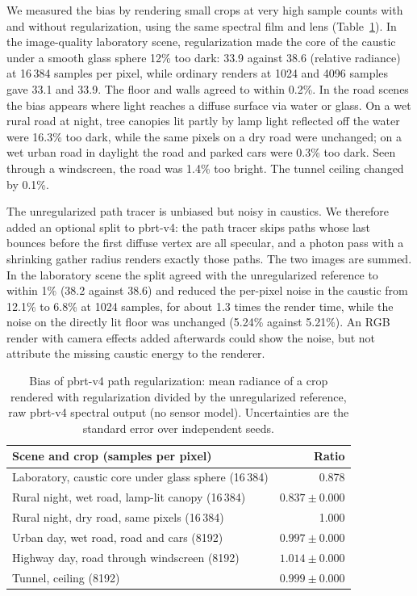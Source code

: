 \documentclass[letterpaper,twocolumn,fleqn]{article}
\begin{document}
We measured the bias by rendering small crops at very high sample counts with and without regularization, using the same spectral film and lens (Table~\ref{tab:bias}). In the image-quality laboratory scene, regularization made the core of the caustic under a smooth glass sphere 12\% too dark: 33.9 against 38.6 (relative radiance) at 16\,384 samples per pixel, while ordinary renders at 1024 and 4096 samples gave 33.1 and 33.9. The floor and walls agreed to within 0.2\%. In the road scenes the bias appears where light reaches a diffuse surface via water or glass. On a wet rural road at night, tree canopies lit partly by lamp light reflected off the water were 16.3\% too dark, while the same pixels on a dry road were unchanged; on a wet urban road in daylight the road and parked cars were 0.3\% too dark. Seen through a windscreen, the road was 1.4\% too bright. The tunnel ceiling changed by 0.1\%.

The unregularized path tracer is unbiased but noisy in caustics. We therefore added an optional split to pbrt-v4: the path tracer skips paths whose last bounces before the first diffuse vertex are all specular, and a photon pass with a shrinking gather radius renders exactly those paths. The two images are summed. In the laboratory scene the split agreed with the unregularized reference to within 1\% (38.2 against 38.6) and reduced the per-pixel noise in the caustic from 12.1\% to 6.8\% at 1024 samples, for about 1.3 times the render time, while the noise on the directly lit floor was unchanged (5.24\% against 5.21\%). An RGB render with camera effects added afterwards could show the noise, but not attribute the missing caustic energy to the renderer.

\begin{table}[t]
\caption{Bias of pbrt-v4 path regularization: mean radiance of a crop rendered with regularization divided by the unregularized reference, raw pbrt-v4 spectral output (no sensor model). Uncertainties are the standard error over independent seeds.}
\label{tab:bias}
\vspace{14pt}
\centering\footnotesize
\begin{tabular}{@{}lr@{}}
\toprule
Scene and crop (samples per pixel) & Ratio \\
\midrule
Laboratory, caustic core under glass sphere (16\,384) & 0.878 \\
Rural night, wet road, lamp-lit canopy (16\,384) & $0.837\pm0.000$ \\
Rural night, dry road, same pixels (16\,384) & 1.000 \\
Urban day, wet road, road and cars (8192) & $0.997\pm0.000$ \\
Highway day, road through windscreen (8192) & $1.014\pm0.000$ \\
Tunnel, ceiling (8192) & $0.999\pm0.000$ \\
\bottomrule
\end{tabular}
\end{table}
\end{document}

